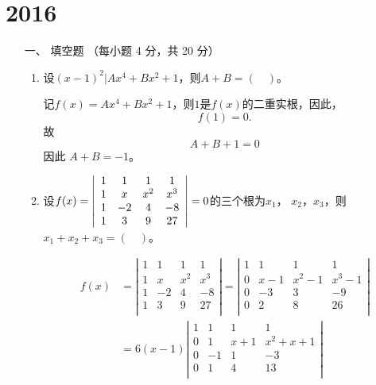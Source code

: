 \section{2016}
\begin{enumerate}[1~]
\renewcommand{\labelenumi}{\textbf{\theenumi. }}
\renewcommand{\Im}{\text{Im }}
\item[一、]
填空题 （每小题 4 分，共 20 分）
\begin{enumerate}[1.~]
\item
设$(x-1)^2|Ax^4+Bx^2+1$，则$A+B=(\quad)$。
\begin{solution}
记$f(x)=Ax^4+Bx^2+1$，则$1$是$f(x)$的二重实根，因此，\[
f(1)=0.
\]
故\[
	A+B+1=0
\]
因此 $A+B=-1$。
\end{solution}

\item 
设$f ( x ) = \left| \begin{array} { c c c c } { 1 } & { 1 } & { 1 } & { 1 } \\ { 1 } & { x } & { x ^ { 2 } } & { x ^ { 3 } } \\ { 1 } & { - 2 } & { 4 } & { - 8 } \\ { 1 } & { 3 } & { 9 } & { 27 } \end{array} \right| = 0$的三个根为$x_1$， $x_2$，$x_3$，则$x_1+x_2+x_3=(\quad)$。
\begin{solution}
\begin{align*}
f\left( x \right) &=\left| \begin{matrix}
	1&		1&		1&		1\\
	1&		x&		x^2&		x^3\\
	1&		-2&		4&		-8\\
	1&		3&		9&		27\\
\end{matrix} \right|=\left| \begin{matrix}
	1&		1&		1&		1\\
	0&		x-1&		x^2-1&		x^3-1\\
	0&		-3&		3&		-9\\
	0&		2&		8&		26\\
\end{matrix} \right|\\
&=6\left( x-1 \right) \left| \begin{matrix}
	1&		1&		1&		1\\
	0&		1&		x+1&		x^2+x+1\\
	0&		-1&		1&		-3\\
	0&		1&		4&		13\\
\end{matrix} \right|

\end{align*}
\end{solution}
\end{enumerate}
\end{enumerate}
